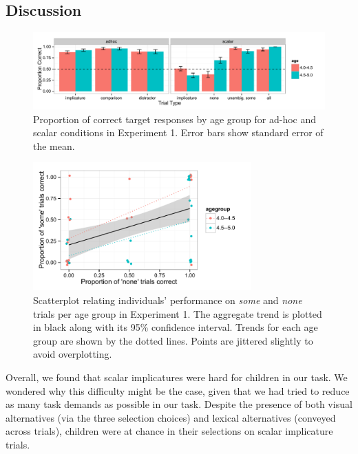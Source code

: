 \documentclass[10pt,letterpaper]{article}
\begin{document}
\subsection{Discussion}

\begin{figure}[t] 
  \begin{center} 
    \includegraphics[width=7.5in]{figures/implicatures_adhocScalar_long.pdf} 
    \caption{\label{fig:expt1} Proportion of correct target responses by age group for ad-hoc and scalar conditions in Experiment 1. Error bars show standard error of the mean.}
    \end{center} 
\end{figure}

\begin{figure}[h] 
  \begin{center} 
    \includegraphics[width=3.3in]{figures/implicatures_adhocScalar_scatterplot.pdf} 
    \caption{\label{fig:expt1scatterplot} Scatterplot relating individuals' performance on \emph{some} and \emph{none} trials per age group in Experiment 1. The aggregate trend is plotted in black along with its 95\% confidence interval. Trends for each age group are shown by the dotted lines. Points are jittered slightly to avoid overplotting.}
    \end{center} 
\end{figure}


Overall, we found that scalar implicatures were hard for children in our task. We wondered why this difficulty might be the case, given that we had tried to reduce as many task demands as possible in our task. Despite the presence of both visual alternatives (via the three selection choices) and lexical alternatives (conveyed across trials), children were at chance in their selections on scalar implicature trials. 
\end{document}
